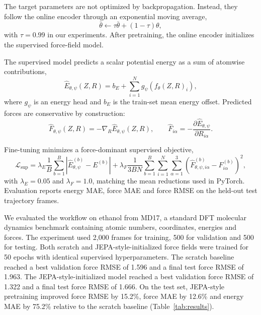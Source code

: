\documentclass[11pt]{article}
\begin{document}
The target parameters are not optimized by backpropagation. Instead, they follow the online encoder through an exponential moving average,
\begin{equation}
    \bar{\theta} \leftarrow \tau \bar{\theta} + (1-\tau)\theta,
\end{equation}
with $\tau=0.99$ in our experiments. After pretraining, the online encoder initializes the supervised force-field model.

The supervised model predicts a scalar potential energy as a sum of atomwise contributions,
\begin{equation}
    \hat{E}_{\theta,\psi}(Z,R)
    =
    b_E
    +
    \sum_{i=1}^{N}
    g_{\psi}\!\left(f_{\theta}(Z,R)_i\right),
    \label{eq:energy}
\end{equation}
where $g_{\psi}$ is an energy head and $b_E$ is the train-set mean energy offset. Predicted forces are conservative by construction:
\begin{equation}
    \hat{F}_{\theta,\psi}(Z,R)
    =
    -\nabla_R \hat{E}_{\theta,\psi}(Z,R),
    \qquad
    \hat{F}_{i\alpha}
    =
    -\frac{\partial \hat{E}_{\theta,\psi}}{\partial R_{i\alpha}}.
    \label{eq:forces}
\end{equation}

Fine-tuning minimizes a force-dominant supervised objective,
\begin{equation}
    \mathcal{L}_{\mathrm{sup}}
    =
    \lambda_E
    \frac{1}{B}\sum_{b=1}^{B}
    \left|
    \hat{E}_{\theta,\psi}^{(b)} - E^{(b)}
    \right|
    +
    \lambda_F
    \frac{1}{3BN}
    \sum_{b=1}^{B}\sum_{i=1}^{N}\sum_{\alpha=1}^{3}
    \left(
    \hat{F}_{\theta,\psi,i\alpha}^{(b)} - F_{i\alpha}^{(b)}
    \right)^2 ,
    \label{eq:supervised}
\end{equation}
with $\lambda_E=0.05$ and $\lambda_F=1.0$, matching the mean reductions used in PyTorch. Evaluation reports energy MAE, force MAE and force RMSE on the held-out test trajectory frames.

We evaluated the workflow on ethanol from MD17, a standard DFT molecular dynamics benchmark containing atomic numbers, coordinates, energies and forces. The experiment used 2,000 frames for training, 500 for validation and 500 for testing. Both scratch and JEPA-style-initialized force fields were trained for 50 epochs with identical supervised hyperparameters. The scratch baseline reached a best validation force RMSE of 1.596 and a final test force RMSE of 1.963. The JEPA-style-initialized model reached a best validation force RMSE of 1.322 and a final test force RMSE of 1.666. On the test set, JEPA-style pretraining improved force RMSE by 15.2\%, force MAE by 12.6\% and energy MAE by 75.2\% relative to the scratch baseline (Table~\ref{tab:results}).
\end{document}
